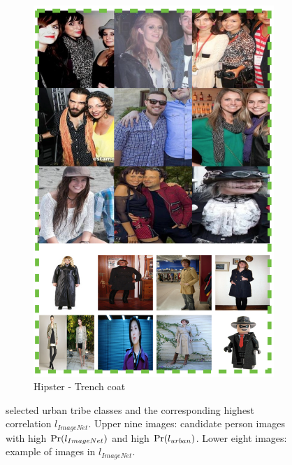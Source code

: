 \documentclass[10pt,twocolumn,letterpaper]{article}
\begin{document}
\begin{figure}[!t]
\begin{center}
\begin{subfigure}[b]{0.2\textwidth}
                \includegraphics[width=\textwidth]{feature4}
                \caption{Hipster - Trench coat}
                \label{feature4}
        \end{subfigure}
\end{center}
\caption{selected urban tribe classes and the corresponding highest correlation $l_{ImageNet}$. Upper nine images: candidate person images with high $\textup{Pr}(l_{ImageNet})$ and high  $\textup{Pr}(l_{urban})$. Lower eight images: example of images in $l_{ImageNet}$.}
\label{features}
\end{figure}
\end{document}
